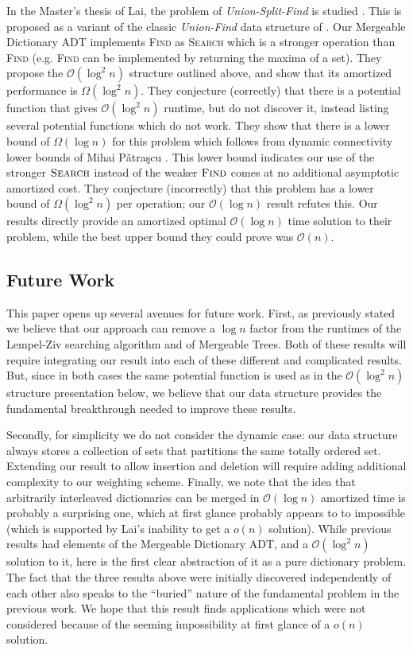 \documentclass[11pt]{article}
\newcommand{\Ds}{Mergeable Dictionary}
\newcommand{\kwSrc}{Search}
\newcommand{\kwFind}{Find}
\newcommand{\Src}{\mbox{\textsc{\kwSrc}}}
\newcommand{\Find}{\mbox{\textsc{\kwFind}}}
\begin{document}
In the Master's thesis of Lai, the problem of \emph{Union-Split-Find} is studied \cite{klaithesis}. This is proposed as a variant of the classic \emph{Union-Find} data structure of \cite{journals/jacm/Tarjan75}. Our \Ds{} ADT implements \Find{} as \Src{} which is a stronger operation than \Find{} (e.g. \Find{} can be implemented by returning the maxima of a set). 
They propose the $\mathcal O(\log^2 n)$ structure outlined above, and show that its amortized performance is $\Omega(\log^2n)$. They conjecture (correctly) that there is a potential function that gives $\mathcal O(\log^2n)$ runtime, but do not discover it, instead listing several potential functions which do not work.  They show that there is a lower bound of $\Omega(\log n)$ for this problem which follows from dynamic connectivity lower bounds of Mihai P\v{a}tra\c{s}cu \cite{conf/stoc/PatrascuD04}. This lower bound indicates our use of the stronger $\Src{}$ instead of the weaker $\Find{}$ comes at no additional asymptotic amortized cost. They conjecture (incorrectly) that this problem has a lower bound of $\Omega(\log^2n)$ per operation; our $\mathcal O(\log n)$ result refutes this. Our results directly provide an amortized optimal $\mathcal O(\log n)$ time solution to their problem, while the best upper bound they could prove was $\mathcal O(n)$. 



\subsection{Future Work} 

This paper opens up several avenues for future work. First, as previously stated we believe that our approach can remove a $\log n$ factor from the runtimes of the Lempel-Ziv searching algorithm and of Mergeable Trees. Both of these results will require integrating our result into each of these different and complicated results. But, since in both cases the same potential function is used as in the $\mathcal O(\log^2 n)$ structure presentation below, we believe that our data structure provides the fundamental breakthrough needed to improve these results. 


Secondly, for simplicity we do not consider the dynamic case: our data structure always stores a collection of sets that partitions the same totally ordered set. Extending our result to allow insertion and deletion will require adding additional complexity to our weighting scheme. Finally, we note that the idea that arbitrarily interleaved dictionaries can be merged in $\mathcal O(\log n)$ amortized time is probably a surprising one, which at first glance probably appears to to impossible (which is supported by Lai's inability to get a $o(n)$ solution). While previous results had elements of the \Ds{} ADT, and a $\mathcal O(\log^2 n)$ solution to it, here is the first clear abstraction of it as a pure dictionary problem. 
The fact that the three results above were initially discovered independently of each other also speaks to the ``buried'' nature of the fundamental problem in the previous work. 
We hope that this result finds applications which were not considered because of the seeming impossibility at first glance of a $o(n)$ solution. 
\end{document}
